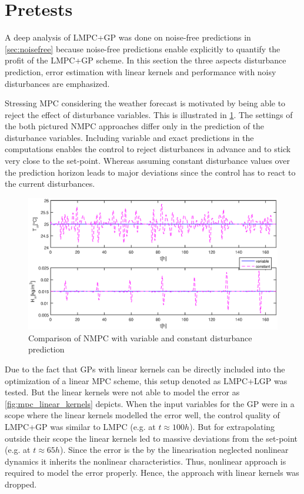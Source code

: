 \section{Pretests}
\label{sec:pretests}

A deep analysis of LMPC+GP was done on noise-free predictions in \cref{sec:noisefree} because noise-free predictions enable explicitly to quantify the profit of the LMPC+GP scheme.
In this section the three aspects disturbance prediction, error estimation with linear kernels and performance with noisy disturbances are emphasized.

Stressing MPC considering the weather forecast is motivated by being able to reject the effect of disturbance variables.
This is illustrated in \cref{fig:benefit_mpc}.
The settings of the both pictured NMPC approaches differ only in the prediction of the disturbance variables.
Including variable and exact predictions in the computations enables the control to reject disturbances in advance and to stick very close to the set-point.
Whereas assuming constant disturbance values over the prediction horizon leads to major deviations since the control has to react to the current disturbances.

\begin{figure}[!t]
\begin{center}
		\includegraphics[width=\textwidth]{../Figures/benefit_mpc.eps}
		\caption{Comparison of NMPC with variable and constant disturbance prediction}
		\label{fig:benefit_mpc}
\end{center}
\end{figure}

Due to the fact that GPs with linear kernels can be directly included into the optimization of a linear MPC scheme, this setup denoted as LMPC+LGP was tested.
But the linear kernels were not able to model the error as \cref{fig:mpc_linear_kernels} depicts.
When the input variables for the GP were in a scope where the linear kernels modelled the error well, the control quality of LMPC+GP was similar to LMPC (e.g. at $t \approx \unit{100}{h}$).
But for extrapolating outside their scope the linear kernels led to massive deviations from the set-point (e.g. at $t \approx \unit{65}{h}$).
Since the error is the by the linearisation neglected nonlinear dynamics it inherits the nonlinear characteristics.
Thus, nonlinear approach is required to model the error properly.
Hence, the approach with linear kernels was dropped.

